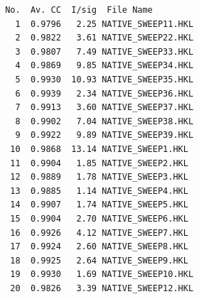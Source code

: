 \documentclass[slides,compress]{beamer}
\begin{document}


\begin{frame}[fragile]
\begin{verbatim}
 No.  Av. CC  I/sig  File Name
   1  0.9796   2.25 NATIVE_SWEEP11.HKL
   2  0.9822   3.61 NATIVE_SWEEP22.HKL
   3  0.9807   7.49 NATIVE_SWEEP33.HKL
   4  0.9869   9.85 NATIVE_SWEEP34.HKL
   5  0.9930  10.93 NATIVE_SWEEP35.HKL
   6  0.9939   2.34 NATIVE_SWEEP36.HKL
   7  0.9913   3.60 NATIVE_SWEEP37.HKL
   8  0.9902   7.04 NATIVE_SWEEP38.HKL
   9  0.9922   9.89 NATIVE_SWEEP39.HKL
  10  0.9868  13.14 NATIVE_SWEEP1.HKL
  11  0.9904   1.85 NATIVE_SWEEP2.HKL
  12  0.9889   1.78 NATIVE_SWEEP3.HKL
  13  0.9885   1.14 NATIVE_SWEEP4.HKL
  14  0.9907   1.74 NATIVE_SWEEP5.HKL
  15  0.9904   2.70 NATIVE_SWEEP6.HKL
  16  0.9926   4.12 NATIVE_SWEEP7.HKL
  17  0.9924   2.60 NATIVE_SWEEP8.HKL
  18  0.9925   2.64 NATIVE_SWEEP9.HKL
  19  0.9930   1.69 NATIVE_SWEEP10.HKL
  20  0.9826   3.39 NATIVE_SWEEP12.HKL
\end{verbatim}
\end{frame}

\end{document}
